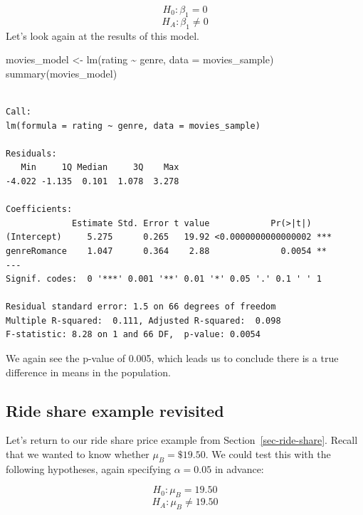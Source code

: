 \documentclass[
  letterpaper,
  DIV=11,
  numbers=noendperiod]{scrreprt}
\newenvironment{Shaded}{\begin{snugshade}}{\end{snugshade}}
\newcommand{\AttributeTok}[1]{\textcolor[rgb]{0.40,0.45,0.13}{#1}}
\newcommand{\FloatTok}[1]{\textcolor[rgb]{0.68,0.00,0.00}{#1}}
\newcommand{\FunctionTok}[1]{\textcolor[rgb]{0.28,0.35,0.67}{#1}}
\newcommand{\NormalTok}[1]{\textcolor[rgb]{0.00,0.23,0.31}{#1}}
\newcommand{\OtherTok}[1]{\textcolor[rgb]{0.00,0.23,0.31}{#1}}
\newcommand{\SpecialCharTok}[1]{\textcolor[rgb]{0.37,0.37,0.37}{#1}}
\newcommand{\StringTok}[1]{\textcolor[rgb]{0.13,0.47,0.30}{#1}}
\theoremstyle{definition}
\theoremstyle{remark}
\begin{document}
\[H_0: \beta_1 = 0\] \[H_A: \beta_1 \neq 0\] Let's look again at the
results of this model.

\begin{Shaded}
\begin{Highlighting}[]
\NormalTok{movies\_model }\OtherTok{\textless{}{-}} \FunctionTok{lm}\NormalTok{(rating }\SpecialCharTok{\textasciitilde{}}\NormalTok{ genre, }\AttributeTok{data =}\NormalTok{ movies\_sample)}
\FunctionTok{summary}\NormalTok{(movies\_model)}
\end{Highlighting}
\end{Shaded}

\begin{verbatim}

Call:
lm(formula = rating ~ genre, data = movies_sample)

Residuals:
   Min     1Q Median     3Q    Max 
-4.022 -1.135  0.101  1.078  3.278 

Coefficients:
             Estimate Std. Error t value            Pr(>|t|)    
(Intercept)     5.275      0.265   19.92 <0.0000000000000002 ***
genreRomance    1.047      0.364    2.88              0.0054 ** 
---
Signif. codes:  0 '***' 0.001 '**' 0.01 '*' 0.05 '.' 0.1 ' ' 1

Residual standard error: 1.5 on 66 degrees of freedom
Multiple R-squared:  0.111, Adjusted R-squared:  0.098 
F-statistic: 8.28 on 1 and 66 DF,  p-value: 0.0054
\end{verbatim}

We again see the p-value of 0.005, which leads us to conclude there is a
true difference in means in the population.

\hypertarget{sec-ride-two-tail}{%
\subsection{Ride share example revisited}\label{sec-ride-two-tail}}

Let's return to our ride share price example from
Section~\ref{sec-ride-share}. Recall that we wanted to know whether
\(\mu_B = \$19.50\). We could test this with the following hypotheses,
again specifying \(\alpha = 0.05\) in advance:

\[H_0: \mu_B = 19.50\] \[H_A: \mu_B \neq 19.50\]

\begin{Shaded}
\end{Shaded}
\end{document}
